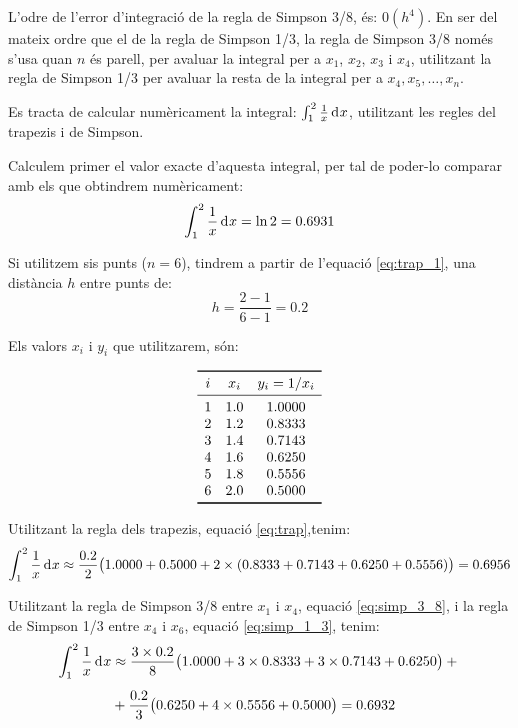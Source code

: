  L'odre de l'error d'integraci\'{o} de la regla de Simpson 3/8, \'{e}s: $0(h^4)$. En ser del mateix ordre que el de la regla de Simpson 1/3, la regla de Simpson 3/8 nom\'{e}s s'usa quan $n$ \'{e}s parell, per avaluar la integral per a $x_1$, $x_2$, $x_3$ i $x_4$, utilitzant la regla de Simpson 1/3 per avaluar la resta de la integral per a  $x_4, x_5, \dotsc , x_n$.

\begin{exemple}
    Es tracta de calcular num\`{e}ricament la integral: $\int_1^2 \frac{1}{x} \diff x$, utilitzant les regles del trapezis i de Simpson.

    Calculem primer el valor exacte d'aquesta integral, per tal de poder-lo comparar amb els que obtindrem  num\`{e}ricament:
    \[
      \int_1^2 \frac{1}{x} \diff x = \ln 2 = \num{0,6931}
    \]

    Si utilitzem sis punts ($n=6$), tindrem a partir de l'equaci\'{o} \eqref{eq:trap_1}, una dist\`{a}ncia $h$ entre punts de:
    \[
        h = \frac{2-1}{6-1} = \num{0,2}
    \]

    Els valors $x_i$ i $y_i$ que utilitzarem, s\'{o}n:
    \vspace{-8mm}
    \begin{center}
        \[\begin{array}{ccc}
           \toprule[1pt]
              i & x_i  & y_i = 1/x_i \\
           \midrule
              1 & \num{1,0} & \num{1,0000} \\
              2 & \num{1,2} & \num{0,8333} \\
              3 & \num{1,4} & \num{0,7143} \\
              4 & \num{1,6} & \num{0.6250} \\
              5 & \num{1,8} & \num{0.5556} \\
              6 & \num{2,0} & \num{0,5000} \\
           \bottomrule[1pt]
        \end{array} \]
    \end{center}

    Utilitzant la regla dels trapezis, equaci\'{o} \eqref{eq:trap},tenim:
    \[
        \int_1^2 \frac{1}{x} \diff x \approx \frac{\num{0,2}}{2} \big(\num{1,0000}+\num{0,5000} +2 \times(\num{0,8333}+ \num{0,7143} +
        \num{0,6250} + \num{0,5556}) \big) = \num{0,6956}
    \]

    Utilitzant la regla de Simpson 3/8 entre $x_1$ i $x_4$, equaci\'{o} \eqref{eq:simp_3_8}, i la  regla de Simpson 1/3 entre $x_4$ i $x_6$, equaci\'{o} \eqref{eq:simp_1_3}, tenim:
    \[\begin{split}
        \int_1^2 \frac{1}{x} \diff x &\approx \frac{3\times\num{0,2}}{8} \big(\num{1,0000}+3\times\num{0,8333} +3\times \num{0,7143} +
        \num{0,6250} \big) +{}\\[0.5em]
        {}&+ \frac{\num{0,2}}{3} \big(\num{0,6250} +4\times \num{0,5556} + \num{0,5000} \big)
        = \num{0,6932}
    \end{split}\]


\end{exemple}
